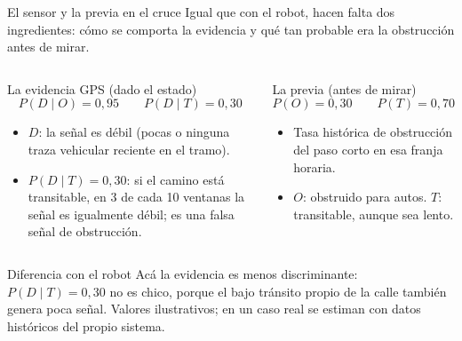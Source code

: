 \documentclass[aspectratio=169,10pt]{beamer}
\begin{document}
\begin{frame}{El sensor y la previa en el cruce}
  \small
  Igual que con el robot, hacen falta dos ingredientes: cómo se comporta la evidencia y qué tan probable era la obstrucción antes de mirar.
  \begin{columns}[T]
      \begin{block}{La evidencia GPS (dado el estado)}
        \[
          P(D\mid O)=0{,}95 \qquad P(D\mid T)=0{,}30
        \]
        \begin{itemize}
          \item $D$: la señal es débil (pocas o ninguna traza vehicular reciente en el tramo).
          \item $P(D\mid T)=0{,}30$: si el camino está transitable, en 3 de cada 10 ventanas la señal es igualmente débil; es una falsa señal de obstrucción.
        \end{itemize}
      \end{block}
      \begin{block}{La previa (antes de mirar)}
        \[
          P(O)=0{,}30 \qquad P(T)=0{,}70
        \]
        \begin{itemize}
          \item Tasa histórica de obstrucción del paso corto en esa franja horaria.
          \item $O$: obstruido para autos. $T$: transitable, aunque sea lento.
        \end{itemize}
      \end{block}
  \end{columns}
  \begin{alertblock}{Diferencia con el robot}
    Acá la evidencia es menos discriminante: $P(D\mid T)=0{,}30$ no es chico, porque el bajo tránsito propio de la calle también genera poca señal. Valores ilustrativos; en un caso real se estiman con datos históricos del propio sistema.
  \end{alertblock}
\end{frame}
\end{document}
